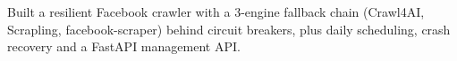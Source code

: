 
\vspace{3pt}
\begin{resume_list}
  \item Built a resilient Facebook crawler with a 3-engine fallback chain (Crawl4AI, Scrapling, facebook-scraper) behind circuit breakers, plus daily scheduling, crash recovery and a FastAPI management API.
\end{resume_list}
